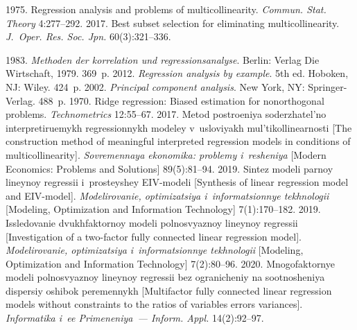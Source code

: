   \begin{multicols}{2}

\renewcommand{\bibname}{\protect\rmfamily References}

{\small\frenchspacing
 {%
 \begin{thebibliography}{99}
 1975. Regression analysis and problems of 
multicollinearity. \textit{Commun. Stat. Theory}  
4:277--292.
 2017. Best subset selection for eliminating multicollinearity. 
\textit{J.~Oper. Res. Soc. Jpn.} 60(3):321--336.

 1983. 
\textit{Methoden der korrelation und regressionsanalyse}. Berlin: Verlag Die Wirtschaft, 1979. 369~p.
 2012. \textit{Regression analysis by example}. 
5th  ed. Hoboken, NJ: Wiley. 424~p.
 2002. \textit{Principal component analysis}. New York, NY: 
Springer-Verlag. 488~p.
 1970. Ridge regression: Biased estimation for 
nonorthogonal problems. \textit{Technometrics} 12:55--67.
 2017. Metod 
postroeniya soderzhatel'no interpretiruemykh regressionnykh modeley v~usloviyakh 
mul'tikollinearnosti [The construction method of meaningful interpreted regression 
models in conditions of multicollinearity]. \textit{Sovremennaya ekonomika: problemy 
i~resheniya} [Modern Economics: Problems and Solutions] 89(5):81--94.
 2019. Sintez modeli parnoy lineynoy regressii i~prosteyshey 
EIV-modeli [Synthesis of linear regression model and EIV-model]. 
\textit{Modelirovanie, optimizatsiya i~informatsionnye tekhnologii} [Modeling, 
Optimization and Information Technology] 7(1):170--182.
 2019. Issledovanie dvukhfaktornoy modeli polnosvyaznoy 
lineynoy regressii [Investigation of a two-factor fully connected linear regression 
model]. \textit{Modelirovanie, optimizatsiya i~informatsionnye tekhnologii} [Modeling, 
Optimization and Information Technology] 7(2):80--96.
 2020. Mnogofaktornye modeli polnosvyaznoy lineynoy 
regressii bez ogranicheniy na sootnosheniya dispersiy oshibok peremennykh 
[Multifactor fully connected linear regression models without constraints to the ratios of 
variables errors variances]. \textit{Informatika i~ee Primeneniya~--- Inform. Appl.} 
14(2):92--97.
\end{thebibliography}

 }
 }

\end{multicols}

